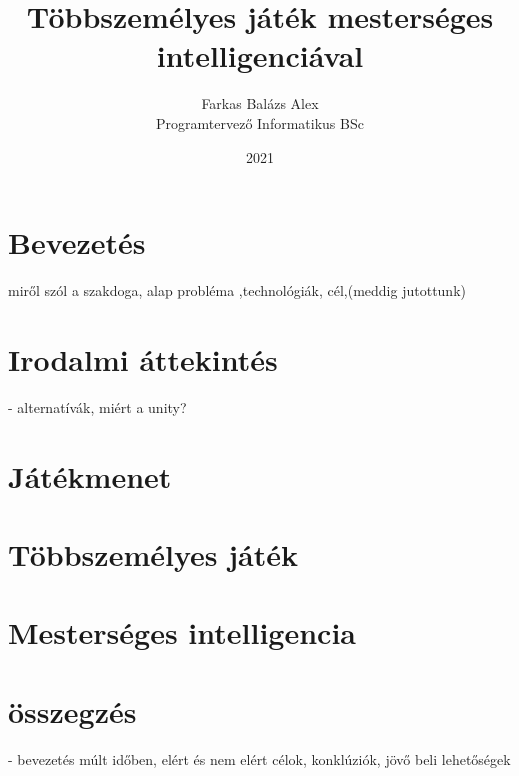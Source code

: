 \documentclass{thesis-ekf}
\theoremstyle{definition}
\theoremstyle{remark}
\begin{document}
\title{Többszemélyes játék mesterséges intelligenciával}
\author{Farkas Balázs Alex\\Programtervező Informatikus BSc}
\date{2021}
\maketitle
\tableofcontents

\chapter*{Bevezetés}
miről szól a szakdoga, alap probléma ,technológiák, cél,(meddig jutottunk)
\chapter{Irodalmi áttekintés} - alternatívák, miért a unity?
\chapter{Játékmenet}
\chapter{Többszemélyes játék}
\chapter{Mesterséges intelligencia}
\chapter{összegzés} - bevezetés múlt időben, elért és nem elért célok, konklúziók, jövő beli lehetőségek

\begin{thebibliography}{2}

\end{thebibliography}
\end{document}
